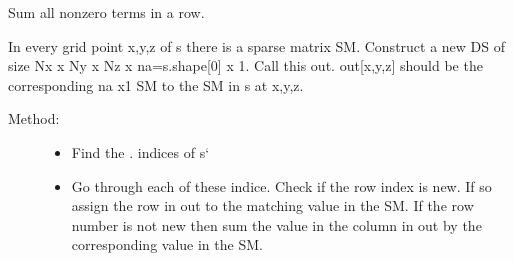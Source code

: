 \documentclass[letterpaper,10pt,english]{sphinxmanual}
\begin{document}
\begin{fulllineitems}
\begin{fulllineitems}
\begin{quote}
\begin{description}
\end{description}\end{quote}

\end{fulllineitems}


\begin{fulllineitems}
\label{index:DictionarySparseMatrix.DS.row_sum}
Sum all nonzero terms in a row.

In every grid point x,y,z of s there is a sparse matrix SM.
Construct a new DS of size Nx x Ny x Nz x na=s.shape{[}0{]} x 1.
Call this out.
out{[}x,y,z{]} should be the corresponding na x1 SM to the SM in s at x,y,z.
\begin{description}
\item[{Method:}] \leavevmode\begin{itemize}
\item {} 
Find the {\hyperref[index:DictionarySparseMatrix.DS]{}}. {\hyperref[index:DictionarySparseMatrix.DS.nonzero]{}} indices of s{}`

\item {} 
Go through each of these indice. Check if the       row index is new. If so assign the row in out to the matching       value in the SM. If the row number is not new then sum the       value in the column in out by the corresponding value in the SM.

\end{itemize}

\end{description}


\end{fulllineitems}
\end{fulllineitems}
\end{document}

